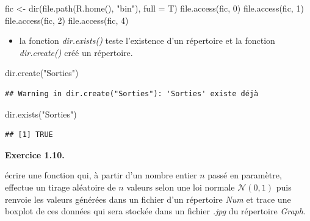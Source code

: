 \documentclass[
]{book}
\newenvironment{Shaded}{\begin{snugshade}}{\end{snugshade}}
\newcommand{\AttributeTok}[1]{\textcolor[rgb]{0.77,0.63,0.00}{#1}}
\newcommand{\DecValTok}[1]{\textcolor[rgb]{0.00,0.00,0.81}{#1}}
\newcommand{\FunctionTok}[1]{\textcolor[rgb]{0.00,0.00,0.00}{#1}}
\newcommand{\NormalTok}[1]{#1}
\newcommand{\OtherTok}[1]{\textcolor[rgb]{0.56,0.35,0.01}{#1}}
\newcommand{\StringTok}[1]{\textcolor[rgb]{0.31,0.60,0.02}{#1}}
\providecommand{\tightlist}{%
  \setlength{\itemsep}{0pt}\setlength{\parskip}{0pt}}
\theoremstyle{definition}
\theoremstyle{definition}
\theoremstyle{definition}
\theoremstyle{definition}
\theoremstyle{remark}
\begin{document}
\begin{Shaded}
\begin{Highlighting}[]
\NormalTok{fic }\OtherTok{\textless{}{-}} \FunctionTok{dir}\NormalTok{(}\FunctionTok{file.path}\NormalTok{(}\FunctionTok{R.home}\NormalTok{(), }\StringTok{"bin"}\NormalTok{), }\AttributeTok{full =}\NormalTok{ T)}
\FunctionTok{file.access}\NormalTok{(fic, }\DecValTok{0}\NormalTok{)}
\FunctionTok{file.access}\NormalTok{(fic, }\DecValTok{1}\NormalTok{)}
\FunctionTok{file.access}\NormalTok{(fic, }\DecValTok{2}\NormalTok{)}
\FunctionTok{file.access}\NormalTok{(fic, }\DecValTok{4}\NormalTok{)}
\end{Highlighting}
\end{Shaded}

\begin{itemize}
\tightlist
\item
  la fonction \emph{dir.exists()} teste l'existence d'un répertoire et la fonction \emph{dir.create()} créé un répertoire.
\end{itemize}

\begin{Shaded}
\begin{Highlighting}[]
\FunctionTok{dir.create}\NormalTok{(}\StringTok{"Sorties"}\NormalTok{)}
\end{Highlighting}
\end{Shaded}

\begin{verbatim}
## Warning in dir.create("Sorties"): 'Sorties' existe déjà
\end{verbatim}

\begin{Shaded}
\begin{Highlighting}[]
\FunctionTok{dir.exists}\NormalTok{(}\StringTok{"Sorties"}\NormalTok{)}
\end{Highlighting}
\end{Shaded}

\begin{verbatim}
## [1] TRUE
\end{verbatim}

\textbf{Exercice 1.10.}

écrire une fonction qui, à partir d'un nombre entier \(n\) passé en paramètre, effectue un tirage aléatoire de \(n\) valeurs selon une loi normale \(\mathcal{N}(0,1)\) puis renvoie les valeurs générées dans un fichier d'un répertoire \emph{Num} et trace une boxplot de ces données qui sera stockée dans un fichier \emph{.jpg} du répertoire \emph{Graph}.
\end{document}
